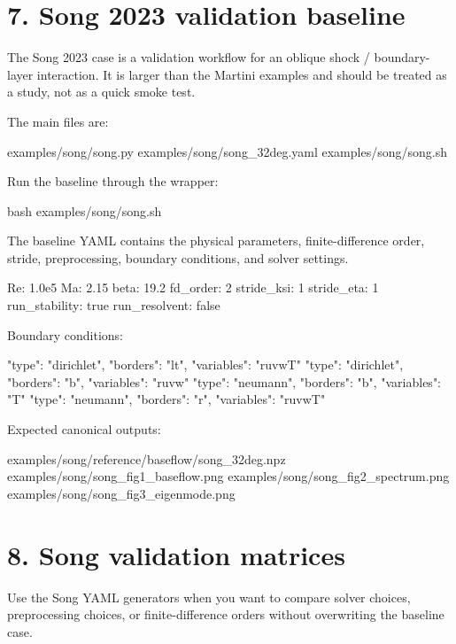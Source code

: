 \documentclass[11pt,a4paper]{article}
\begin{document}
\section*{7. Song 2023 validation baseline}

The Song 2023 case is a validation workflow for an oblique shock / boundary-layer interaction. It is larger than the Martini examples and should be treated as a study, not as a quick smoke test.

The main files are:

\begin{outputbox}
examples/song/song.py
examples/song/song_32deg.yaml
examples/song/song.sh
\end{outputbox}

Run the baseline through the wrapper:

\begin{commandbox}
bash examples/song/song.sh
\end{commandbox}

The baseline YAML contains the physical parameters, finite-difference order, stride, preprocessing, boundary conditions, and solver settings.

\begin{snippetbox}
Re: 1.0e5
Ma: 2.15
beta: 19.2
fd_order: 2
stride_ksi: 1
stride_eta: 1
run_stability: true
run_resolvent: false
\end{snippetbox}

Boundary conditions:

\begin{snippetbox}
{"type": "dirichlet", "borders": "lt", "variables": "ruvwT"}
{"type": "dirichlet", "borders": "b",  "variables": "ruvw"}
{"type": "neumann",   "borders": "b",  "variables": "T"}
{"type": "neumann",   "borders": "r",  "variables": "ruvwT"}
\end{snippetbox}

Expected canonical outputs:

\begin{outputbox}
examples/song/reference/baseflow/song_32deg.npz
examples/song/song_fig1_baseflow.png
examples/song/song_fig2_spectrum.png
examples/song/song_fig3_eigenmode.png
\end{outputbox}

\section*{8. Song validation matrices}

Use the Song YAML generators when you want to compare solver choices, preprocessing choices, or finite-difference orders without overwriting the baseline case.
\end{document}
